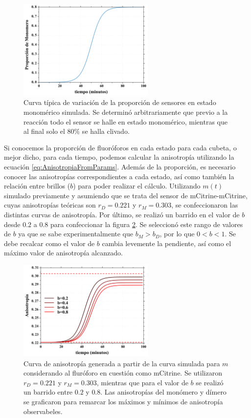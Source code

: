 \begin{figure}
\centering
    \includegraphics[width=0.6\textwidth]{./img/m_sim.png}
    \caption{Curva típica de variación de la proporción de sensores en estado monomérico simulada. Se determinó arbitrariamente que previo a la reacción todo el sensor se halle en estado monomérico, mientras que al final solo el $80\%$ se halla clivado.}
    \label{fig:m_sim}
\end{figure}

Si conocemos la proporción de fluoróforos en cada estado para cada cubeta, o mejor dicho, para cada tiempo, podemos calcular la anisotropía utilizando la ecuación \ref{eq:AnisotropiaFromParams}. Además de la proporción, es necesario conocer las anisotropías correspondientes a cada estado, así como también la relación entre brillos ($b$) para poder realizar el cálculo. Utilizando $m(t)$ simulado previamente y asumiendo que se trata del sensor de mCitrine-mCitrine, cuyas anisotropías teóricas son $r_D=0.221$ y $r_M=0.303$, se confeccionaron las distintas curvas de anisotropía. Por último, se realizó un barrido en el valor de $b$ desde $0.2$ a $0.8$ para confeccionar la figura \ref{fig:aniso_sim}. Se seleccionó este rango de valores de $b$ ya que se sabe experimentalmente que $b_M>b_D$, por lo que $0<b<1$. Se debe recalcar como el valor de $b$ cambia levemente la pendiente, así como el máximo valor de anisotropía alcanzado.

\begin{figure}
\centering
    \includegraphics[width=0.6\textwidth]{./img/r_sim.png}
    \caption{Curva de anisotropía generada a partir de la curva simulada para $m$ considerando al fluróforo en cuestión como mCitrine. Se utilizaron $r_D=0.221$ y $r_M=0.303$, mientras que para el valor de $b$ se realizó un barrido entre $0.2$ y $0.8$. Las anisotropías del monómero y dímero se graficaron para remarcar los máximos y mínimos de anisotropía observabeles.}
    \label{fig:aniso_sim}
\end{figure}

